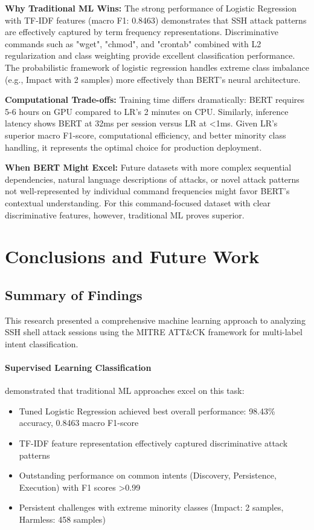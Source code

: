 \documentclass[acmlarge,screen,nonacm]{acmart}
\begin{document}
\textbf{Why Traditional ML Wins:} The strong performance of Logistic Regression with TF-IDF features (macro F1: 0.8463) demonstrates that SSH attack patterns are effectively captured by term frequency representations. Discriminative commands such as "wget", "chmod", and "crontab" combined with L2 regularization and class weighting provide excellent classification performance. The probabilistic framework of logistic regression handles extreme class imbalance (e.g., Impact with 2 samples) more effectively than BERT's neural architecture.

\textbf{Computational Trade-offs:} Training time differs dramatically: BERT requires 5-6 hours on GPU compared to LR's 2 minutes on CPU. Similarly, inference latency shows BERT at 32ms per session versus LR at <1ms. Given LR's superior macro F1-score, computational efficiency, and better minority class handling, it represents the optimal choice for production deployment.

\textbf{When BERT Might Excel:} Future datasets with more complex sequential dependencies, natural language descriptions of attacks, or novel attack patterns not well-represented by individual command frequencies might favor BERT's contextual understanding. For this command-focused dataset with clear discriminative features, however, traditional ML proves superior.

\section{Conclusions and Future Work}

\subsection{Summary of Findings}

This research presented a comprehensive machine learning approach to analyzing SSH shell attack sessions using the MITRE ATT\&CK framework for multi-label intent classification.

\paragraph{Supervised Learning Classification} demonstrated that traditional ML approaches excel on this task:
\begin{itemize}
    \item Tuned Logistic Regression achieved best overall performance: 98.43\% accuracy, 0.8463 macro F1-score
    \item TF-IDF feature representation effectively captured discriminative attack patterns
    \item Outstanding performance on common intents (Discovery, Persistence, Execution) with F1 scores >0.99
    \item Persistent challenges with extreme minority classes (Impact: 2 samples, Harmless: 458 samples)
\end{itemize}
\end{document}
